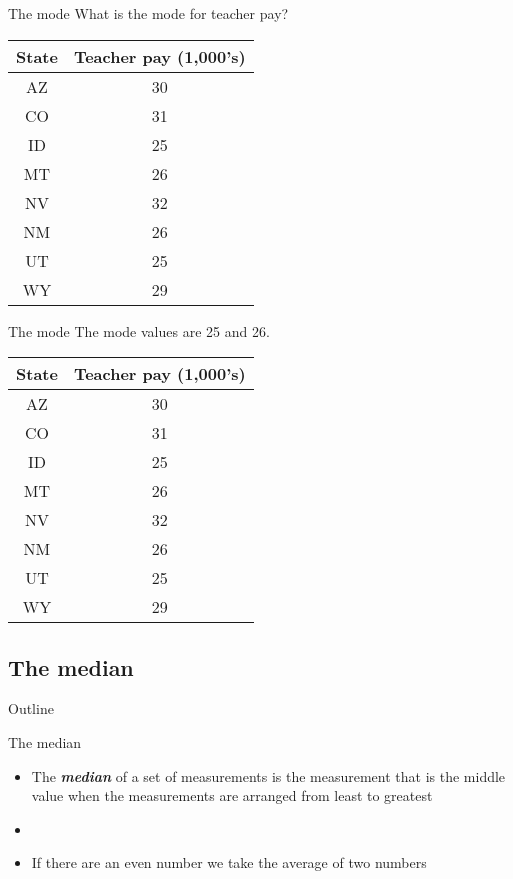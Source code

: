 \documentclass[xcolor=dvipsnames]{beamer}
\begin{document}
\begin{frame}{The mode}
What is the mode for teacher pay?
	\begin{center}
	\begin{tabular}{|c|c|}
		\hline 
		\textbf{State} & \textbf{Teacher pay (1,000's)} \\ 
		\hline \hline
		AZ & 30 \\ \hline 
		CO &  31 \\ \hline 
		ID & 25  \\  \hline 
		MT &  26 \\ \hline 
		NV & 32 \\ \hline 
		NM &  26 \\ \hline 
		UT &  25 \\ \hline 
		WY &  29 \\ \hline 
	\end{tabular} 
\end{center}
\end{frame}

\begin{frame}{The mode}
	The mode values are 25 and 26.
	\begin{center}
		\begin{tabular}{|c|c|}
			\hline 
			\textbf{State} & \textbf{Teacher pay (1,000's)} \\ 
			\hline \hline
			AZ & 30 \\ \hline 
			CO &  31 \\ \hline 
			ID & 25  \\  \hline 
			MT &  26 \\ \hline 
			NV & 32 \\ \hline 
			NM &  26 \\ \hline 
			UT &  25 \\ \hline 
			WY &  29 \\ \hline 
		\end{tabular} 
	\end{center}
\end{frame}

\subsection{The median}
\begin{frame}{Outline}
	\tableofcontents[currentsection,subsectionstyle=show/shaded/hide]
\end{frame}

\begin{frame}{The median}
	\begin{itemize}
		\item The \emph{\textbf{median}} of a set of measurements is the measurement that is the middle value when the measurements are arranged from least to greatest
		\item[]
		\item If there are an even number we take the average of two numbers
	\end{itemize}
\end{frame}
\end{document}
